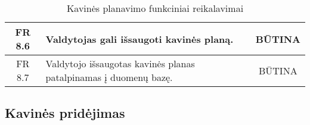 \documentclass{VUMIFPSkursinis}
\begin{document}
\begin{center}
\begin{table}[H]
\begin{tabular}{|p{2cm}|p{}|p{}|}
		\multicolumn{1}{|c|}{FR 8.6}&
		{Valdytojas gali išsaugoti kavinės planą.}&
		\multicolumn{1}{|c|}{BŪTINA}\\				
	\hline
	
		\multicolumn{1}{|c|}{FR 8.7}&
		{Valdytojo išsaugotas kavinės planas patalpinamas į duomenų bazę.}&
		\multicolumn{1}{|c|}{BŪTINA}\\				
	\hline
	
	\end{tabular}
	\caption{Kavinės planavimo funkciniai reikalavimai}
	\label{table:KavinėsPlanavimas}
	\end{table}
	
	
\end{center}

\pagebreak

\subsection{Kavinės pridėjimas}
\end{document}
